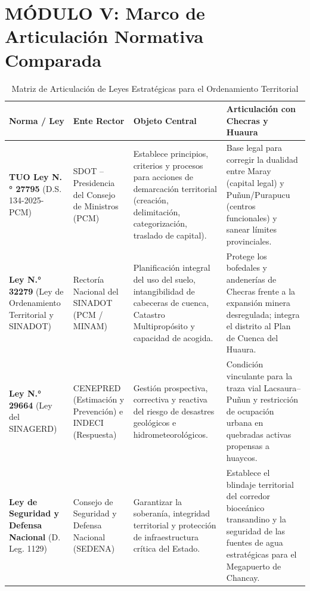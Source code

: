 \documentclass[11pt,a4paper]{article}
\begin{document}
\newpage
\section{MÓDULO V: Marco de Articulación Normativa Comparada}

\begin{table}[htbp]
\centering
\small
\caption{Matriz de Articulación de Leyes Estratégicas para el Ordenamiento Territorial}
\begin{tabularx}{\textwidth}{p{3.2cm}p{3.5cm}p{4cm}X}
\toprule
\textbf{Norma / Ley} & \textbf{Ente Rector} & \textbf{Objeto Central} & \textbf{Articulación con Checras y Huaura} \\
\midrule
\textbf{TUO Ley N.° 27795} \newline (D.S. 134-2025-PCM) & SDOT -- Presidencia del Consejo de Ministros (PCM) & Establece principios, criterios y procesos para acciones de demarcación territorial (creación, delimitación, categorización, traslado de capital). & Base legal para corregir la dualidad entre Maray (capital legal) y Puñun/Purapucu (centros funcionales) y sanear límites provinciales. \\
\addlinespace
\textbf{Ley N.° 32279} \newline (Ley de Ordenamiento Territorial y SINADOT) & Rectoría Nacional del SINADOT (PCM / MINAM) & Planificación integral del uso del suelo, intangibilidad de cabeceras de cuenca, Catastro Multipropósito y capacidad de acogida. & Protege los bofedales y andenerías de Checras frente a la expansión minera desregulada; integra el distrito al Plan de Cuenca del Huaura. \\
\addlinespace
\textbf{Ley N.° 29664} \newline (Ley del SINAGERD) & CENEPRED (Estimación y Prevención) e INDECI (Respuesta) & Gestión prospectiva, correctiva y reactiva del riesgo de desastres geológicos e hidrometeorológicos. & Condición vinculante para la traza vial Lacsaura--Puñun y restricción de ocupación urbana en quebradas activas propensas a huaycos. \\
\addlinespace
\textbf{Ley de Seguridad y Defensa Nacional} \newline (D. Leg. 1129) & Consejo de Seguridad y Defensa Nacional (SEDENA) & Garantizar la soberanía, integridad territorial y protección de infraestructura crítica del Estado. & Establece el blindaje territorial del corredor bioceánico transandino y la seguridad de las fuentes de agua estratégicas para el Megapuerto de Chancay. \\
\bottomrule
\end{tabularx}
\end{table}
\end{document}
